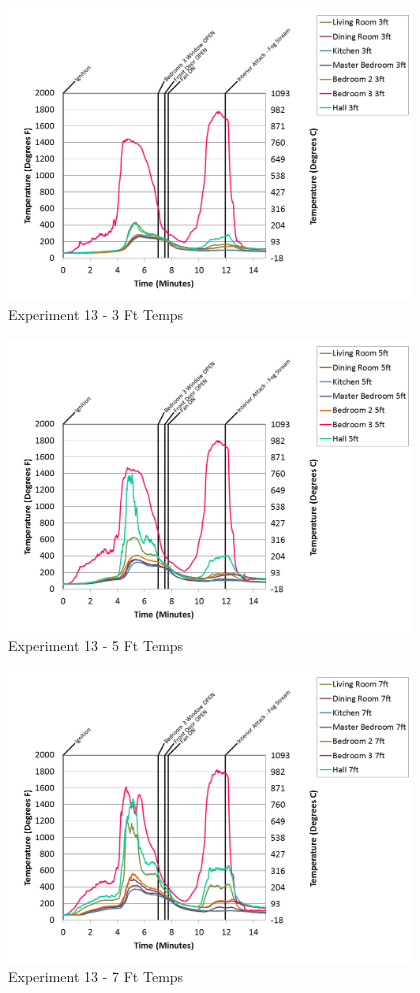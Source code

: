\documentclass{article}
\begin{document}
\begin{appendices}
\begin{figure}[h!]
	\centering
	\includegraphics[height=3.05in]{0_Images/Results_Charts/Exp_13_Charts/3FtTemps.png}
	\caption{Experiment 13 - 3 Ft Temps}
\end{figure}

\clearpage

\begin{figure}[h!]
	\centering
	\includegraphics[height=3.05in]{0_Images/Results_Charts/Exp_13_Charts/5FtTemps.png}
	\caption{Experiment 13 - 5 Ft Temps}
\end{figure}


\begin{figure}[h!]
	\centering
	\includegraphics[height=3.05in]{0_Images/Results_Charts/Exp_13_Charts/7FtTemps.png}
	\caption{Experiment 13 - 7 Ft Temps}
\end{figure}


\end{appendices}
\end{document}
